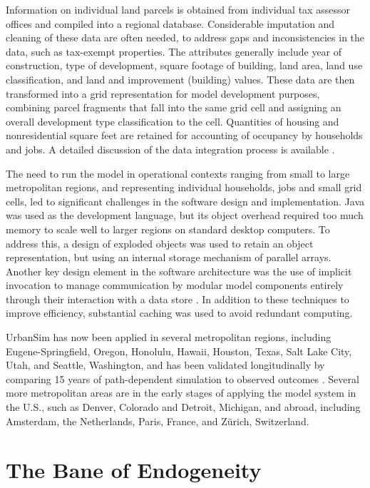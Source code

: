 \documentclass[12pt,a4paper]{article}
\begin{document}
Information on individual land parcels is obtained from individual
tax assessor offices and compiled into a regional database.
Considerable imputation and cleaning of these data are often
needed, to address gaps and inconsistencies in the data, such as
tax-exempt properties.  The attributes generally include year of
construction, type of development, square footage of building,
land area, land use classification, and land and improvement
(building) values.  These data are then transformed into a grid
representation for model development purposes, combining parcel
fragments that fall into the same grid cell and assigning an
overall development type classification to the cell.  Quantities
of housing and nonresidential square feet are retained for
accounting of occupancy by households and jobs.  A detailed
discussion of the data integration process is available
\cite{waddell-cuspa-2004}.

The need to run the model in operational contexts ranging from
small to large metropolitan regions, and representing individual
households, jobs and small grid cells, led to significant
challenges in the software design and implementation.  Java was
used as the development language, but its object overhead required
too much memory to scale well to larger regions on standard
desktop computers.  To address this, a design of exploded objects
was used to retain an object representation, but using an internal
storage mechanism of parallel arrays.  Another key design element
in the software architecture was the use of implicit invocation to
manage communication by modular model components entirely through
their interaction with a data store \cite{noth-ceus-2003}.  In
addition to these techniques to improve efficiency, substantial
caching was used to avoid redundant computing.

UrbanSim has now been applied in several metropolitan regions,
including Eugene-Springfield, Oregon, Honolulu, Hawaii, Houston,
Texas, Salt Lake City, Utah, and Seattle, Washington, and has been
validated longitudinally by comparing 15 years of path-dependent
simulation to observed outcomes \cite{waddell-japa-2002}.  Several
more metropolitan areas are in the early stages of applying the
model system in the U.S., such as Denver, Colorado and Detroit,
Michigan, and abroad, including Amsterdam, the Netherlands, Paris,
France, and Z\"{u}rich, Switzerland.


\section{The Bane of Endogeneity}
\end{document}
